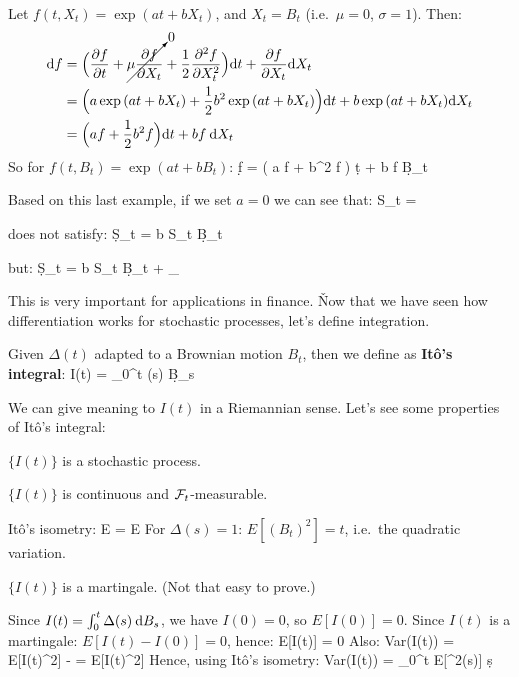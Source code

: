 \be
Let $f(t, X_{t}) = \exp{(at + b X_{t})}$, and $X_{t} = B_{t}$ (i.e.\ $\mu = 0$, $\sigma = 1$). Then:
\begin{align*}
\mathrm{d} f &= \Big( \frac{\partial f}{\partial t} + \cancelto{0}{\mu \frac{\partial f}{\partial X_{t}}} + \frac{1}{2}
\frac{\partial^{2} f}{\partial X_{t}^{2}} \Big) \mathrm{d} t + \frac{\partial f}{\partial X_{t}} \mathrm{d} X_{t} \\
&= \Big( a \exp{(at + b X_{t})} + \frac{1}{2} b^{2} \exp{(at + b X_{t})} \Big) \mathrm{d} t + b \exp{(at + b X_{t})} \mathrm{d} X_{t} \\
&= \Big( a f + \frac{1}{2} b^{2} f \Big) \mathrm{d} t + b f \: \mathrm{d} X_{t}
\end{align*}
So for $f(t, B_{t}) = \exp{(at + b B_{t})}$:
\bse
\d f = \Big( a f +  b^{2} f \Big) \d t + b f \: \d B_{t}
\ese
\ee

Based on this last example, if we set $a = 0$ we can see that:
\bse
S_{t} = 
\ese

does not satisfy:
\bse
\d S_{t} = b S_{t} \: \d B_{t}
\ese

but:
\bse
\d S_{t} = b S_{t} \: \d B_{t} + _{}
\ese

This is very important for applications in finance. \v

Now that we have seen how differentiation works for stochastic processes, let's define integration.

\bd[It\^o's Integral]
Given $\Delta(t)$ adapted to a Brownian motion $B_{t}$, then we define as \textbf{It\^o's integral}:
\bse
I(t) = \int_{0}^{t} \Delta(s) \: \d B_{s}
\ese
\ed

We can give meaning to $I(t)$ in a Riemannian sense. Let's see some properties of It\^o's integral:
\ben
\item $\{ I(t) \}$ is a stochastic process.
\item $\{ I(t) \}$ is continuous and $\mathcal{F}_{t}$-measurable.
\item It\^o's isometry:
\bse
E  = E 
\ese
For $\Delta(s) = 1$: $E[(B_{t})^{2}] = t$, i.e.\ the quadratic variation.
\item $\{ I(t) \}$ is a martingale. (Not that easy to prove.)
\item Since $I(t) = \int_{0}^{t} \Delta(s) \: \mathrm{d} B_{s}$, we have $I(0) = 0$, so $E[I(0)] = 0$. Since $I(t)$ is a
martingale: $E[I(t) - I(0)] = 0$, hence:
\bse
E[I(t)] = 0
\ese
Also:
\bse
Var(I(t)) = E[I(t)^{2}] -  = E[I(t)^{2}]
\ese
Hence, using It\^o's isometry:
\bse
Var(I(t)) = \int_{0}^{t} E[\Delta^{2}(s)] \: \d s
\ese
\een


